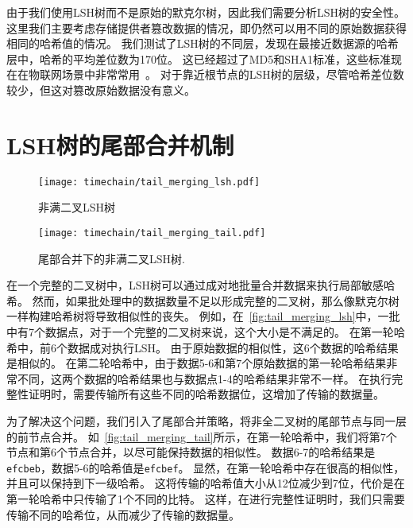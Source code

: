 由于我们使用LSH树而不是原始的默克尔树，因此我们需要分析LSH树的安全性。
这里我们主要考虑存储提供者篡改数据的情况，即仍然可以用不同的原始数据获得相同的哈希值的情况。
我们测试了LSH树的不同层，发现在最接近数据源的哈希层中，哈希的平均差位数为170位。
这已经超过了MD5和SHA1标准，这些标准现在在物联网场景中非常常用~\cite{chi2017hashing,landge2018secured}。
对于靠近根节点的LSH树的层级，尽管哈希差位数较少，但这对篡改原始数据没有意义。

\section{LSH树的尾部合并机制}

\begin{figure}[t]
    \centering
	\begin{minipage}{0.6\linewidth}
        \centering
        \texttt{[image: timechain/tail\_merging\_lsh.pdf]}
        \caption{非满二叉LSH树}
        \label{fig:tail_merging_lsh}
	\end{minipage}
\end{figure}

\begin{figure}[t]
    \centering
	\begin{minipage}{0.6\linewidth}
        \centering
        \texttt{[image: timechain/tail\_merging\_tail.pdf]}
	\end{minipage}
	\caption{尾部合并下的非满二叉LSH树.}
	\label{fig:tail_merging_tail}
\end{figure}

在一个完整的二叉树中，LSH树可以通过成对地批量合并数据来执行局部敏感哈希。
然而，如果批处理中的数据数量不足以形成完整的二叉树，那么像默克尔树一样构建哈希树将导致相似性的丧失。
例如，在~\autoref{fig:tail_merging_lsh}中，一批中有7个数据点，对于一个完整的二叉树来说，这个大小是不满足的。
在第一轮哈希中，前6个数据成对执行LSH。
由于原始数据的相似性，这6个数据的哈希结果是相似的。
在第二轮哈希中，由于数据5-6和第7个原始数据的第一轮哈希结果非常不同，这两个数据的哈希结果也与数据点1-4的哈希结果非常不一样。
在执行完整性证明时，需要传输所有这些不同的哈希数据位，这增加了传输的数据量。

为了解决这个问题，我们引入了尾部合并策略，将非全二叉树的尾部节点与同一层的前节点合并。
如~\autoref{fig:tail_merging_tail}所示，在第一轮哈希中，我们将第7个节点和第6个节点合并，以尽可能保持数据的相似性。
数据6-7的哈希结果是\texttt{efcbeb}，数据5-6的哈希值是\texttt{efcbef}。
显然，在第一轮哈希中存在很高的相似性，并且可以保持到下一级哈希。
这将传输的哈希值大小从12位减少到7位，代价是在第一轮哈希中只传输了1个不同的比特。
这样，在进行完整性证明时，我们只需要传输不同的哈希位，从而减少了传输的数据量。

